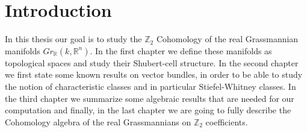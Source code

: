 \chapter*{Introduction}
In this thesis our goal is to study the $\mathbb{Z}_2$ Cohomology of the real Grassmannian manifolds $Gr_{\mathbb{R}}(k,\mathbb{R}^n)$. In the first chapter we define these manifolds as topological spaces and study their Shubert-cell structure. In the second chapter we first state some known results on vector bundles, in order to be able to study the notion of characteristic classes and in particular Stiefel-Whitney classes. In the third chapter we summarize some algebraic results that are needed for our computation and finally, in the last chapter we are going to fully describe the Cohomology algebra of the real Grassmannians on $\mathbb{Z}_2$ coefficients.

